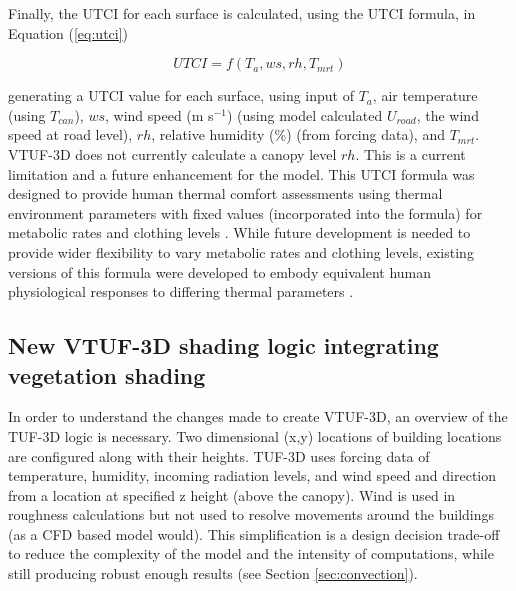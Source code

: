 \documentclass[final,3p,times,authoryear]{elsarticle}
\begin{document}

Finally, the UTCI for each surface is calculated, using the \cite{Brode2009u} UTCI formula, in Equation (\ref{eq:utci})

\begin{equation}\label{eq:utci}
  UTCI = f(T_{a}, ws, rh, T_{mrt})
\end{equation}

generating a UTCI value for each surface, using input of $T_{a}$, air temperature (using $T_{can}$), $ws$, wind speed (m s$^{-1}$) (using model calculated $U_{road}$, the wind speed at road level), $rh$, relative humidity (\%) (from forcing data), and $T_{mrt}$. VTUF-3D does not currently calculate a canopy level $rh$. This is a current limitation and a future enhancement for the model. This UTCI formula was designed to provide human thermal comfort assessments using thermal environment parameters with fixed values (incorporated into the formula) for metabolic rates and clothing levels \citep{Brode2012a}. While future development is needed to provide wider flexibility to vary metabolic rates and clothing levels, existing versions of this formula were developed to embody equivalent human physiological responses to differing thermal parameters \citep{Havenith2012,Fiala2012}.



\subsection{New VTUF-3D shading logic integrating vegetation shading}\label{sec:integration}
In order to understand the changes made to create VTUF-3D, an overview of the TUF-3D logic is necessary. Two dimensional (x,y) locations of building locations are configured along with their heights. TUF-3D uses forcing data of temperature, humidity, incoming radiation levels, and wind speed and direction from a location at specified z height (above the canopy). Wind is used in roughness calculations but not used to resolve movements around the buildings (as a CFD based model would). This simplification is a design decision trade-off to reduce the complexity of the model and the intensity of computations, while still producing robust enough results (see Section \ref{sec:convection}).
\end{document}
